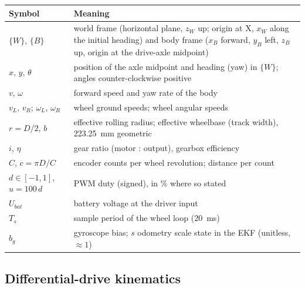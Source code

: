 \documentclass[11pt,a4paper]{article}
\begin{document}
\begin{center}
\small
\begin{tabularx}{\textwidth}{@{}lL@{}}
\toprule
\textbf{Symbol} & \textbf{Meaning}\\
\midrule
$\{W\}$, $\{B\}$ & world frame (horizontal plane, $z_W$ up; origin at X, $x_W$ along the initial heading) and body frame ($x_B$ forward, $y_B$ left, $z_B$ up, origin at the drive-axle midpoint)\\
$x,\,y,\,\theta$ & position of the axle midpoint and heading (yaw) in $\{W\}$; angles counter-clockwise positive\\
$v,\,\omega$ & forward speed and yaw rate of the body\\
$v_L,\,v_R$; $\omega_L,\,\omega_R$ & wheel ground speeds; wheel angular speeds\\
$r=D/2$, $b$ & effective rolling radius; effective wheelbase (track width), \qty{223.25}{mm} geometric\\
$i$, $\eta$ & gear ratio (motor : output), gearbox efficiency\\
$C$, $c=\pi D/C$ & encoder counts per wheel revolution; distance per count\\
$d\in[-1,1]$, $u=100\,d$ & PWM duty (signed), in \si{\percent} where so stated\\
$U_{bat}$ & battery voltage at the driver input\\
$T_s$ & sample period of the wheel loop (\qty{20}{ms})\\
$b_g$ & gyroscope bias; $s$ odometry scale state in the EKF (unitless, $\approx1$)\\
\bottomrule
\end{tabularx}
\end{center}

\subsection{Differential-drive kinematics}\label{sec:kinematics}
\end{document}
